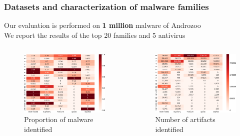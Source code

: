 \begin{frame}
    \frametitle{Datasets and characterization of malware families}
    \centering

    \normalsize{Our evaluation is performed on \textbf{1 million} malware of Androzoo} \\
    \smallskip{}
    \small{We report the results of the top 20 families and 5 antivirus}

    \begin{columns}
        \begin{column}{0.5\textwidth}
            \begin{figure}[!ht]
                \includegraphics[width=\textwidth]{figures/apgraph/results/proportions.pdf}
                \caption{\scriptsize{Proportion of malware identified}}
            \end{figure}
        \end{column}

        \begin{column}{0.5\textwidth}
            \begin{figure}[!ht]
                \includegraphics[width=\textwidth]{figures/apgraph/results/numbers.pdf}
                \caption{\scriptsize{Number of artifacts identified}}
            \end{figure}
        \end{column}
    \end{columns}


\end{frame}
